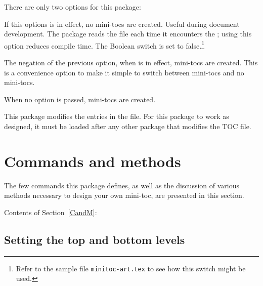 \documentclass[10pt]{article}
\newcommand{\insMinitoci}[2][]{%
  \begin{center}#2
  \begin{minipage}[c]{0.8\linewidth}
  Contents of Section~\ref*{CandM}: \nameref*{CandM}
  \par\kern2pt
  \insertminitoc[#1]
  \end{minipage}
  \end{center}
}
\begin{document}
There are only two options for this package:
\begin{aebDescript}
    \item[\opt{nomintocs}] If this options is in effect, no mini-tocs are
        created. Useful during document development. The 
        package reads the  file each time it encounters the
        ; using this option reduces compile time. The
        Boolean switch  is set to false.\footnote{Refer
        to the sample file \texttt{minitoc-art.tex} to see how this switch
        might be used.}
    \item[\opt{!nominitocs}] The negation of the previous option, when
         is in effect, mini-tocs are created. This is a
        convenience option to make it simple to switch between mini-tocs and
        no mini-tocs.
\end{aebDescript}
When no option is passed, mini-tocs are created.

\newtopic\noindent{}%
This package modifies the entries in the  file. For this
package to work as designed, it must be loaded after any other package that
modifies the TOC file.

\section{Commands and methods}

The few commands this package defines, as well as the discussion of various
methods necessary to design your own mini-toc, are presented in this section.

\insMinitoci{\minitocFmt}

\subsection[\protect\miniorfulltoc{\protect\textbf}{Setting the top and bottom levels}]{Setting the top and bottom levels}

\end{document}
